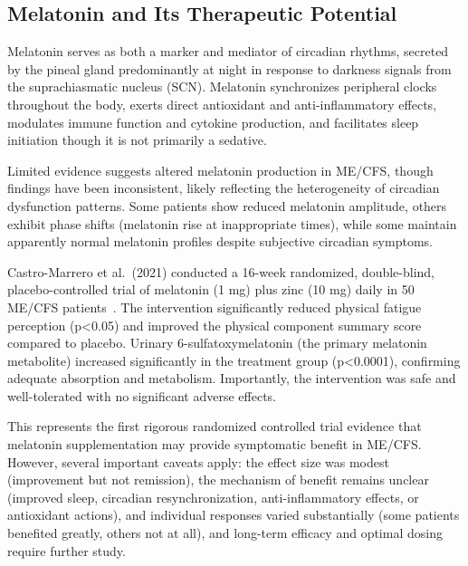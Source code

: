 \subsection{Melatonin and Its Therapeutic Potential}

Melatonin serves as both a marker and mediator of circadian rhythms, secreted by the pineal gland predominantly at night in response to darkness signals from the suprachiasmatic nucleus (SCN). Melatonin synchronizes peripheral clocks throughout the body, exerts direct antioxidant and anti-inflammatory effects, modulates immune function and cytokine production, and facilitates sleep initiation though it is not primarily a sedative.

Limited evidence suggests altered melatonin production in ME/CFS, though findings have been inconsistent, likely reflecting the heterogeneity of circadian dysfunction patterns. Some patients show reduced melatonin amplitude, others exhibit phase shifts (melatonin rise at inappropriate times), while some maintain apparently normal melatonin profiles despite subjective circadian symptoms.

\begin{achievement}
\label{ach:melatonin-treatment}
Castro-Marrero et al.\ (2021) conducted a 16-week randomized, double-blind, placebo-controlled trial of melatonin (1 mg) plus zinc (10 mg) daily in 50 ME/CFS patients~\cite{castromarrero2021melatonin}. The intervention significantly reduced physical fatigue perception (p<0.05) and improved the physical component summary score compared to placebo. Urinary 6-sulfatoxymelatonin (the primary melatonin metabolite) increased significantly in the treatment group (p<0.0001), confirming adequate absorption and metabolism. Importantly, the intervention was safe and well-tolerated with no significant adverse effects.
\end{achievement}

This represents the first rigorous randomized controlled trial evidence that melatonin supplementation may provide symptomatic benefit in ME/CFS. However, several important caveats apply: the effect size was modest (improvement but not remission), the mechanism of benefit remains unclear (improved sleep, circadian resynchronization, anti-inflammatory effects, or antioxidant actions), and individual responses varied substantially (some patients benefited greatly, others not at all), and long-term efficacy and optimal dosing require further study.

